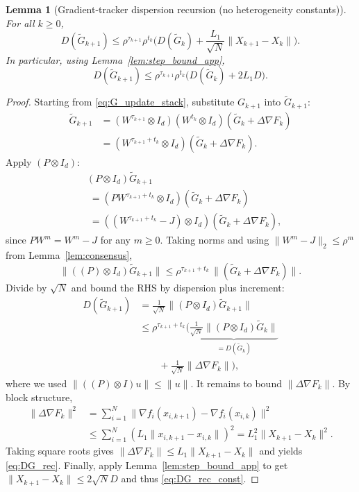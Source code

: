 \documentclass[10pt,twocolumn,letterpaper]{article}
\def\one{1}%
\def\J{J}%
\def\Pmat{P}%
\theoremstyle{compact}
\newtheorem{lemma}[theorem]{Lemma}
\theoremstyle{compactremark}
\newcommand{\one}{\mathbf{1}}
\newcommand{\J}{\left(\frac{1}{N}\one\one^\top\right)}
\newcommand{\Pmat}{I-\J}
\begin{document}
\begin{lemma}[Gradient-tracker dispersion recursion (no heterogeneity constants)]\label{lem:DG_rec}
For all $k\ge0$,
\begin{equation}\label{eq:DG_rec}
D(\tilde G_{k+1})
\le \rho^{\tau_{k+1}}\rho^{t_k}\Big(D(\tilde G_k)+\frac{L_1}{\sqrt N}\|X_{k+1}-X_k\|\Big).
\end{equation}
In particular, using Lemma~\ref{lem:step_bound_app},
\begin{equation}\label{eq:DG_rec_const}
D(\tilde G_{k+1})
\le \rho^{\tau_{k+1}}\rho^{t_k}\Big(D(\tilde G_k)+2L_1D\Big).
\end{equation}
\end{lemma}
\begin{proof}
Starting from \eqref{eq:G_update_stack}, substitute $G_{k+1}$ into $\tilde G_{k+1}$:
\begin{align*}
\tilde G_{k+1}
&=(W^{\tau_{k+1}}\!\otimes\! I_d)(W^{t_k}\!\otimes\! I_d)(\tilde G_k\!+\!\Delta\nabla F_k)\\
&=(W^{\tau_{k+1}+t_k}\!\otimes\! I_d)(\tilde G_k\!+\!\Delta\nabla F_k).
\end{align*}
Apply $(\Pmat\otimes I_d)$:
\begin{align*}
&(\Pmat\!\otimes\! I_d)\tilde G_{k+1}\\
&\;=(\Pmat W^{\tau_{k+1}+t_k}\!\otimes\! I_d)(\tilde G_k+\Delta\nabla F_k)\\
&\;=((W^{\tau_{k+1}+t_k}\!-\!\J)\!\otimes\! I_d)(\tilde G_k+\Delta\nabla F_k),
\end{align*}
since $\Pmat W^m=W^m-\J$ for any $m\ge0$.
Taking norms and using $\|W^{m}-\J\|_2\le \rho^{m}$ from Lemma~\ref{lem:consensus},
\[
\|((\Pmat)\otimes I_d)\tilde G_{k+1}\|
\le \rho^{\tau_{k+1}+t_k}\,\|(\tilde G_k+\Delta\nabla F_k)\|.
\]
Divide by $\sqrt N$ and bound the RHS by dispersion plus increment:
\begin{align*}
D(\tilde G_{k+1})
&=\tfrac1{\sqrt N}\|(\Pmat\!\otimes\! I_d)\tilde G_{k+1}\|\\
&\le \rho^{\tau_{k+1}+t_k}\bigl(
\underbrace{\tfrac1{\sqrt N}\|(\Pmat\!\otimes\! I_d)\tilde G_k\|}_{=D(\tilde G_k)}\\
&\qquad+\tfrac1{\sqrt N}\|\Delta\nabla F_k\|\bigr),
\end{align*}
where we used $\|((\Pmat)\otimes I)u\|\le \|u\|$.
It remains to bound $\|\Delta\nabla F_k\|$.
By block structure,
\begin{align*}
\|\Delta\nabla F_k\|^2
&=\textstyle\sum_{i=1}^N\|\nabla f_i(x_{i,k+1})\!-\!\nabla f_i(x_{i,k})\|^2\\
&\le \textstyle\sum_{i=1}^N (L_1\|x_{i,k+1}\!-\!x_{i,k}\|)^2
=L_1^2\|X_{k+1}\!-\!X_k\|^2.
\end{align*}
Taking square roots gives $\|\Delta\nabla F_k\|\le L_1\|X_{k+1}-X_k\|$ and yields \eqref{eq:DG_rec}.
Finally, apply Lemma~\ref{lem:step_bound_app} to get $\|X_{k+1}-X_k\|\le 2\sqrt N D$ and thus \eqref{eq:DG_rec_const}.
\end{proof}
\end{document}
